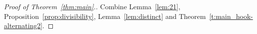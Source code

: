 \begin{proof}[Proof of Theorem~\ref{thm:main}.]
    Combine Lemma~\ref{lem:21}, Proposition~\ref{prop:divisibility}, Lemma~\ref{lem:distinct} and Theorem~\ref{t:main_hook-alternating2}. 
\end{proof}
